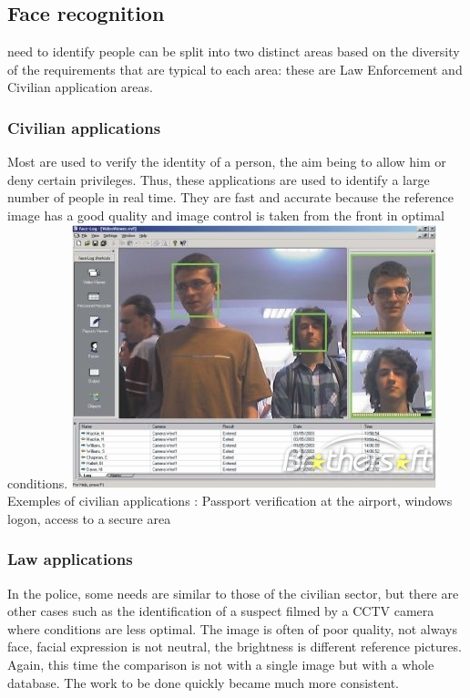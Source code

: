 \subsection{Face recognition}
 need to identify people can be split into two distinct areas based on the diversity of the requirements that are typical to each area: these are Law Enforcement and Civilian application areas.

\subsubsection{Civilian applications }

Most are used to verify the identity of a person, the aim being to allow him or deny certain privileges. Thus, these applications are used to identify a large number of people in real time. They are fast and accurate because the reference image has a good quality and image control is taken from the front in optimal conditions.
\includegraphics[width=\linewidth]{img/face_recognition_civil}
Exemples of civilian applications : Passport verification at the airport, windows logon, access to a secure area 

\subsubsection{Law applications }
In the police, some needs are similar to those of the civilian sector, but there are other cases such as the identification of a suspect filmed by a CCTV camera where conditions are less optimal.
The image is often of poor quality, not always face, facial expression is not neutral, the brightness is different reference pictures.
Again, this time the comparison is not with a single image but with a whole database. The work to be done quickly became much more consistent.

